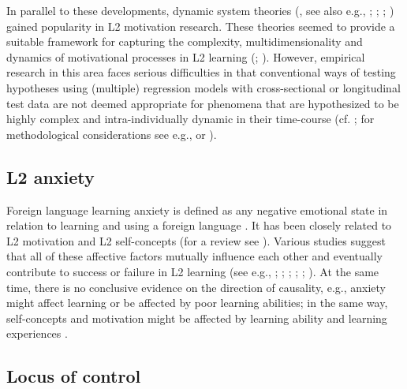 \documentclass[output=paper]{langscibook}
\begin{document}
In parallel to these developments, dynamic system theories (\citealt{LarsenFreeman1997}, see also e.g., \citealt{EllisLarsenFreeman2006}; \citealt{DeBotEtAl2007}; \citealt{LarsenFreemanCameron2008}; \citealt{LarsenFreeman2017}) gained popularity in L2 motivation research. These theories seemed to provide a suitable framework for capturing the complexity, multidimensionality and dynamics of motivational processes in L2 learning (\citealt{Doernyei2010}; \citealt{Waninge2015}). However, empirical research in this area faces serious difficulties in that conventional ways of testing hypotheses using (multiple) regression models with cross-sectional or longitudinal test data are not deemed appropriate for phenomena that are hypothesized to be highly complex and intra-individually dynamic in their time-course (cf. \citealt{Doernyei2014}; for methodological considerations see e.g., \citealt{VerspoorEtAl2011} or \citealt{DoernyeiEtAl2015}).

\subsection{L2 anxiety} %

Foreign language learning anxiety is defined as any negative emotional state in relation to learning and using a foreign language \citep{MacIntyre1999}. It has been closely related to L2 motivation and L2 self-concepts (for a review see \citealt{Horwitz2001}). Various studies suggest that all of these affective factors mutually influence each other and eventually contribute to success or failure in L2 learning (see e.g., \citealt{NoelsEtAl2000}; \citealt{PekrunEtAl2002}; \citealt{Stoeckli2004}; \citealt{KormosCsizer2008}; \citealt{LiuHuang2011}; \citealt{Heinzmann2013}). At the same time, there is no conclusive evidence on the direction of causality, e.g., anxiety might affect learning or be affected by poor learning abilities; in the same way, self-concepts and motivation might be affected by learning ability and learning experiences \citep{SparksEtAl2011}.

\subsection{Locus of control} %
\end{document}
